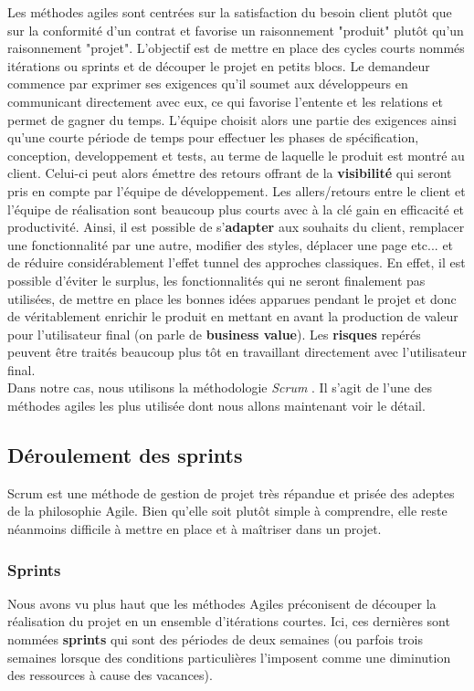 	Les méthodes agiles sont centrées sur la satisfaction du besoin client plutôt que sur la conformité d'un contrat et favorise un raisonnement "produit" plutôt qu'un raisonnement "projet". L'objectif est de mettre en place des cycles courts nommés itérations ou sprints et de découper le projet en petits blocs. Le demandeur commence par exprimer ses exigences qu'il soumet aux développeurs en communicant directement avec eux, ce qui favorise l'entente et les relations et permet de gagner du temps. L'équipe choisit alors une partie des exigences ainsi qu'une courte période de temps pour effectuer les phases de spécification, conception, developpement et tests, au terme de laquelle le produit est montré au client. Celui-ci peut alors émettre des retours offrant de la \textbf{visibilité} qui seront pris en compte par l'équipe de développement. Les allers/retours entre le client et l'équipe de réalisation sont beaucoup plus courts avec à la clé gain en efficacité et productivité. Ainsi, il est possible de s'\textbf{adapter} aux souhaits du client, remplacer une fonctionnalité par une autre, modifier des styles, déplacer une page etc... et de réduire considérablement l'effet tunnel des approches classiques. En effet, il est possible d'éviter le surplus, les fonctionnalités qui ne seront finalement pas utilisées, de mettre en place les bonnes idées apparues pendant le projet et donc de véritablement enrichir le produit en mettant en avant la production de valeur pour l'utilisateur final (on parle de \textbf{business value}). Les \textbf{risques} repérés peuvent être traités beaucoup plus tôt en travaillant directement avec l'utilisateur final. \\

	Dans notre cas, nous utilisons la méthodologie \textit{Scrum} \cite{bib_agile3}. Il s'agit de l'une des méthodes agiles les plus utilisée dont nous allons maintenant voir le détail.

\subsection{Déroulement des sprints}
\label{deroulementSprint}

	Scrum est une méthode de gestion de projet très répandue et prisée des adeptes de la philosophie Agile. Bien qu'elle soit plutôt simple à comprendre, elle reste néanmoins difficile à mettre en place et à maîtriser dans un projet. \\
	
	\subsubsection{Sprints}
	Nous avons vu plus haut que les méthodes Agiles préconisent de découper la réalisation du projet en un ensemble d'itérations courtes. Ici, ces dernières sont nommées \textbf{sprints} qui sont des périodes de deux semaines (ou parfois trois semaines lorsque des conditions particulières l'imposent comme une diminution des ressources à cause des vacances).
	
